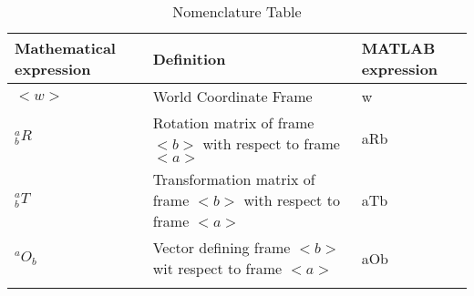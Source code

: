 \section*{}
\begin{longtable}{|p{4cm}|p{4cm}|p{4cm}|}
    \hline
    Mathematical expression & Definition & MATLAB expression \\
    \hline 
    $<w>$ & World Coordinate Frame &  w\\[0.4cm]
    $^a_b R$ & Rotation matrix of frame $<b>$ with respect to frame $<a>$  & aRb \\[1.2cm]
    $^a_b T$ & Transformation matrix of frame $<b>$ with respect to frame $<a>$ & aTb \\
    $^a O_b$ & Vector defining frame $<b>$ wit respect to frame $<a>$ & aOb\\
    [1.2cm]
    \hline
    \caption{Nomenclature Table}
\end{longtable}
